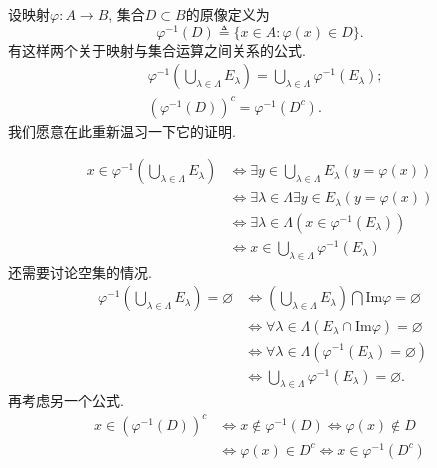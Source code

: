 设映射$\varphi:A\to B$, 集合$D\subset B$的原像定义为
\begin{equation}
\varphi^{-1}(D) \triangleq \{x\in A:\varphi(x)\in D\}.
\end{equation}
有这样两个关于映射与集合运算之间关系的公式.
\begin{align}
&\varphi^{-1}\left( \bigcup_{\lambda\in\Lambda}E_\lambda \right) = \bigcup_{\lambda\in\Lambda}\varphi^{-1}\left( E_\lambda \right); \\
&\left(\varphi^{-1}(D)\right)^c = \varphi^{-1}(D^c).
\end{align}
我们愿意在此重新温习一下它的证明.
\begin{yyProof}
	\begin{align}
	x\in \varphi^{-1}\left( \bigcup_{\lambda\in\Lambda}E_\lambda \right) &\Longleftrightarrow \exists y\in \bigcup_{\lambda\in\Lambda}E_{\lambda}\left(y = \varphi(x)\right)\nonumber\\
	&\Longleftrightarrow \exists \lambda\in\Lambda\exists y\in E_{\lambda}\left(y = \varphi(x)\right)\nonumber\\
	&\Longleftrightarrow \exists \lambda\in\Lambda  \left(x\in\varphi^{-1}(E_{\lambda})\right)\nonumber\\
	&\Longleftrightarrow x\in\bigcup_{\lambda\in\Lambda}\varphi^{-1}\left( E_\lambda \right)
	\end{align}
	还需要讨论空集的情况.
	\begin{align}
	~~\varphi^{-1}\left( \bigcup_{\lambda\in\Lambda}E_\lambda \right) = \varnothing &\Longleftrightarrow \left(\bigcup_{\lambda\in\Lambda}E_\lambda\right)\bigcap \mathrm{Im}\varphi = \varnothing \nonumber\\
	&\Longleftrightarrow \forall\lambda\in\Lambda\left( E_{\lambda}\cap \mathrm{Im}\varphi  \right)= \varnothing\nonumber\\
	&\Longleftrightarrow \forall\lambda\in\Lambda\left( \varphi^{-1}(E_{\lambda}) = \varnothing \right)\nonumber\\
	&\Longleftrightarrow \bigcup_{\lambda\in\Lambda}\varphi^{-1}(E_{\lambda}) = \varnothing.
	\end{align}
	再考虑另一个公式.
	\begin{align}
	x\in \left(\varphi^{-1}(D)\right)^c &\Longleftrightarrow x\notin \varphi^{-1}(D) \Longleftrightarrow \varphi(x)\notin D\nonumber\\
	&\Longleftrightarrow\varphi(x)\in D^c\Longleftrightarrow x\in \varphi^{-1}(D^c)
	\end{align}
\end{yyProof}

